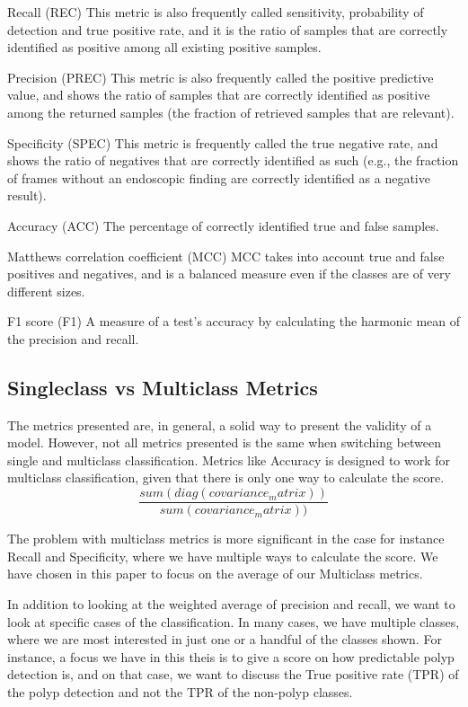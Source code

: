 Recall (REC)    This metric is also frequently called sensitivity, probability of detection and true positive rate, and it is the ratio of samples that are correctly identified as positive among all existing positive samples.

Precision (PREC)    This metric is also frequently called the positive predictive value, and shows the ratio of samples that are correctly identified as positive among the returned samples (the fraction of retrieved samples that are relevant).

Specificity (SPEC)    This metric is frequently called the true negative rate, and shows the ratio of negatives that are correctly identified as such (e.g., the fraction of frames without an endoscopic finding are correctly identified as a negative result).

Accuracy (ACC)    The percentage of correctly identified true and false samples.

Matthews correlation coefficient (MCC)    MCC takes into account true and false positives and negatives, and is a balanced measure even if the classes are of very different sizes.

F1 score (F1)    A measure of a test’s accuracy by calculating the harmonic mean of the precision and recall.

\subsection{Singleclass vs Multiclass Metrics}

The metrics presented are, in general, a solid way to present the validity of a model. However, not all metrics presented is the same when switching between single and multiclass classification.  Metrics like Accuracy is designed to work for multiclass classification, given that there is only one way to calculate the score.
\begin{equation}
        \frac{sum(diag(covariance_matrix))}{sum(covariance_matrix))}
\end{equation}
	
	


The problem with multiclass metrics is more significant in the case for instance Recall and Specificity, where we have multiple ways to calculate the score. 
We have chosen in this paper to focus on the  average of our Multiclass metrics. 

In addition to looking at the weighted average of precision and recall, we want to look at specific cases of the classification.  In many cases, we have multiple classes, where we are most interested in just one or a handful of the classes shown. 
For instance, a focus we have in this theis is to give a score on how predictable polyp detection is, and on that case, we want to discuss the True positive rate (TPR) of the polyp detection and not the TPR of the non-polyp classes. 

